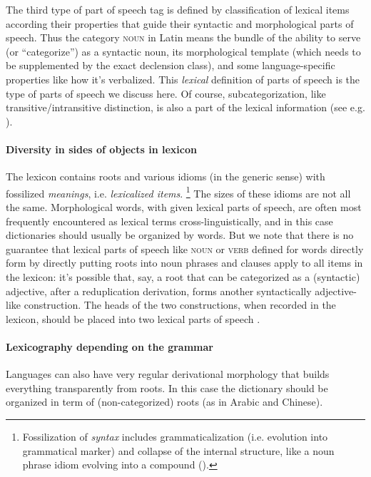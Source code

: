 \documentclass[a4paper, oneside, 12pt]{report}
\newcommand*{\citechap}[1]{chap.~{#1}}
\newcommand*{\term}[1]{\emph{#1}}
\newcommand*{\category}[1]{\textsc{#1}}
\begin{document}
The third type of part of speech tag is defined by classification of lexical items
according their properties that guide their syntactic and morphological parts of speech.
Thus the category \category{noun} in Latin means the bundle of 
the ability to serve (or ``categorize'') as a syntactic noun, its morphological template
(which needs to be supplemented by the exact declension class),
and some language-specific properties like how it's verbalized.
This \emph{lexical} definition of parts of speech is the type of parts of speech we discuss here.
Of course, subcategorization, like transitive/intransitive distinction,
is also a part of the lexical information (see e.g. ).

\paragraph*{Diversity in sides of objects in lexicon}
The lexicon contains roots and various idioms (in the generic sense) with fossilized \emph{meanings},
i.e. \term{lexicalized items}.%
\footnote{
    Fossilization of \emph{syntax} includes grammaticalization (i.e. evolution into grammatical marker)
    and collapse of the internal structure,
    like a noun phrase idiom evolving into a compound
    ().
}
The sizes of these idioms are not all the same.
Morphological words, with given lexical parts of speech,
are often most frequently encountered as lexical terms cross-linguistically,
and in this case dictionaries should usually be organized by words.
But we note that there is no guarantee that lexical parts of speech like \category{noun} or \category{verb}
defined for words directly form by directly putting roots into noun phrases and clauses 
apply to all items in the lexicon:
it's possible that, say, a root that can be categorized as a (syntactic) adjective,
after a reduplication derivation, forms another syntactically adjective-like construction.
The heads of the two constructions, when recorded in the lexicon,
should be placed into two lexical parts of speech \citep[\citechap{5}]{paul2014new}. 

\paragraph*{Lexicography depending on the grammar}
Languages can also have very regular derivational morphology that builds everything transparently from roots.
In this case the dictionary should be organized in term of (non-categorized) roots (as in Arabic and Chinese).
\end{document}
